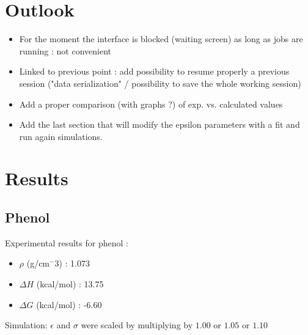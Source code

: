 \documentclass[12pt,a4paper]{article}
\begin{document}

\section{Outlook}

\begin{itemize}
\item For the moment the interface is blocked (waiting screen) as long as jobs are
running : not convenient

\item Linked to previous point : add possibility to resume properly a previous
session ("data serialization" / possibility to save the whole working session)

\item Add a proper comparison (with graphs ?) of exp. vs. calculated values

\item Add the last section that will modify the epsilon parameters with a fit and run again 
simulations.
\end{itemize}



\section{Results}

\subsection{Phenol}

Experimental results for phenol :

\begin{itemize}
\item $\rho$ (g/cm$^-3$) : 1.073
\item $\Delta H$ (kcal/mol) : 13.75
\item $\Delta G$ (kcal/mol) : -6.60
\end{itemize}

\medskip

Simulation: $\epsilon$ and $\sigma$ were scaled by multiplying by $1.00$ or $1.05$ or $1.10$
\end{document}
